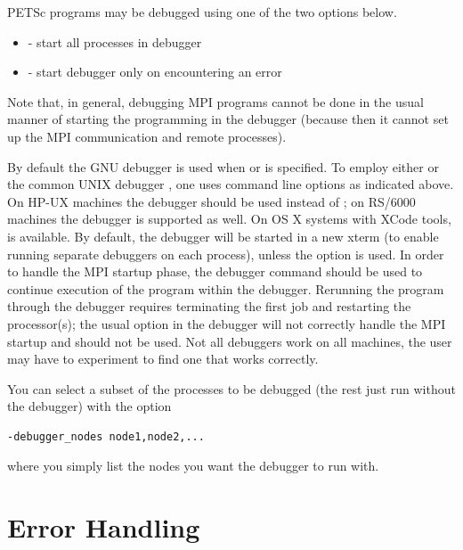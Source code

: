 {{PETSc programs may be debugged using one of the two options below.
\begin{itemize}
\item {}  
     - start all processes in debugger
\item {} 
       - start debugger only on encountering an error
\end{itemize}
Note that, in general, debugging MPI programs cannot be done in the usual
manner of starting the programming in the debugger (because then it cannot
set up the MPI communication and remote processes).

By default the GNU debugger  is used when 
or  is specified. 
To employ either  or the common UNIX debugger , one uses
command line options as indicated above. On HP-UX machines the debugger
 should be used instead of ; on RS/6000 machines the
 debugger is supported as well. 
On OS X systems with XCode tools,  is available.
By  default, the debugger will be started in a new xterm (to enable
running separate debuggers on each process), unless the option
 is used.
In order to handle the MPI startup phase, the debugger command 
should be used to continue execution of the program within the debugger.
Rerunning the program through the debugger requires terminating
the first job and restarting the processor(s); the usual 
option in the debugger will not correctly handle the MPI startup and
should not be used.  Not all debuggers work on all machines, the user
may have to experiment to find one that works correctly.

You can select a subset of the processes to be debugged (the rest just run
without the debugger) with the option
\begin{lstlisting}
-debugger_nodes node1,node2,...
\end{lstlisting}
where you simply list the nodes you want the debugger to run with.

\section{Error Handling}  

}}
